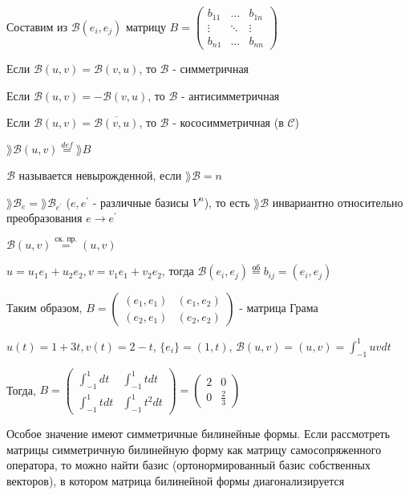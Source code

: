 \documentclass[12pt]{article}
\begin{document}
    \Nota Составим из $\mathcal{B}(e_i, e_j)$ матрицу $B = \begin{pmatrix}b_{11} & \dots & b_{1n} \\ \vdots & \ddots & \vdots \\ b_{n1} & \dots & b_{nn}\end{pmatrix}$

     Если $\mathcal{B}(u, v) = \mathcal{B}(v, u)$, то $\mathcal{B}$ - симметричная

     Если $\mathcal{B}(u, v) = -\mathcal{B}(v, u)$, то $\mathcal{B}$ - антисимметричная

     Если $\mathcal{B}(u, v) = \overline{\mathcal{B}(v, u)}$, то $\mathcal{B}$ - кососимметричная (в $\mathcal{C}$)

    \Def $\rang \mathcal{B}(u, v) \stackrel{def}{=} \rang B$

     $\mathcal{B}$ называется невырожденной, если $\rang \mathcal{B} = n$

     $\rang \mathcal{B}_e = \rang \mathcal{B}_{e^\prime} $ ($e, e^\prime$ - различные базисы $V^n$), то есть $\rang \mathcal{B}$ инвариантно относительно преобразования $e \to e^\prime$

    \Ex $\mathcal{B}(u, v) \stackrel{\text{ск. пр.}}{=} (u, v)$

    $u = u_1 e_1 + u_2 e_2, v = v_1 e_1 + v_2 e_2$, тогда $\mathcal{B}(e_i, e_j) \stackrel{\text{об}}{=} b_{ij} = (e_i, e_j)$

    Таким образом, $B = \begin{pmatrix}(e_1, e_1) & (e_1, e_2) \\ (e_2, e_1) & (e_2, e_2)\end{pmatrix}$ - матрица Грама

    \Ex $u(t) = 1 + 3t, v(t) = 2 - t$, $\{e_i\} = (1, t)$, $\mathcal{B}(u, v) = (u, v) = \int_{-1}^1 uv dt$

    Тогда, $B = \begin{pmatrix}\int_{-1}^1 dt & \int_{-1}^1 t dt \\ \int_{-1}^1 t dt & \int_{-1}^1 t^2 dt\end{pmatrix} = \begin{pmatrix}2 & 0 \\ 0 & \frac{2}{3}\end{pmatrix}$


    \Nota Особое значение имеют симметричные билинейные формы. 
    Если рассмотреть матрицы симметричную билинейную форму как матрицу самосопряженного оператора, то можно найти базис
    (ортонормированный базис собственных векторов), в котором матрица билинейной формы диагонализируется
\end{document}

